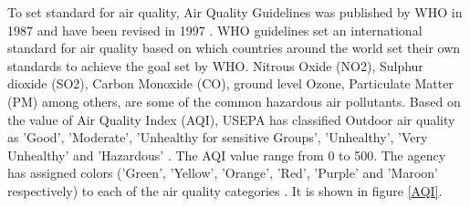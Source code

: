 \documentclass[sigconf]{acmart}
\begin{document}
{  To set standard for air quality, Air Quality Guidelines was published by WHO in 1987 and have been revised in 1997 \cite{who-health-topics}. WHO guidelines set an international standard for air quality based on which countries around the world set their own standards to achieve the goal set by WHO. Nitrous Oxide (NO2), Sulphur dioxide (SO2), Carbon Monoxide (CO), ground level Ozone, Particulate Matter (PM) among others, are some of the common hazardous air pollutants. Based on the value of Air Quality Index (AQI), USEPA has classified Outdoor air quality as 'Good', 'Moderate', 'Unhealthy for sensitive Groups', 'Unhealthy', 'Very Unhealthy' and 'Hazardous' \cite{airnow-gov}. The AQI value range from 0 to 500. The agency has assigned colors ('Green', 'Yellow', 'Orange', 'Red', 'Purple' and 'Maroon' respectively) to each of the air quality categories \cite{airnow-gov}. It is shown in figure \ref{AQI}.
}
\end{document}
